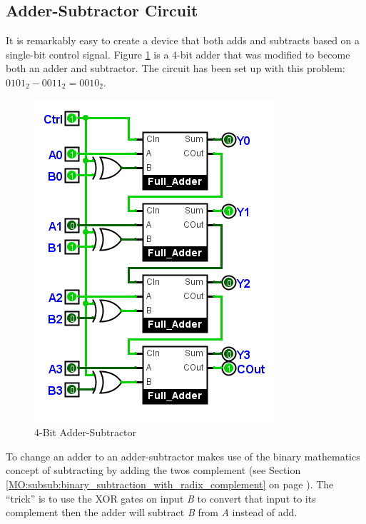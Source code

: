 \subsection{Adder-Subtractor Circuit}
\label{CL:subsec:adder_subtractor_circuit}

It is remarkably easy to create a device that both adds and subtracts based on a single-bit control signal. Figure \ref{fig:08_11} is a 4-bit adder that was modified to become both an adder and subtractor. The circuit has been set up with this problem: $ 0101_2 - 0011_2 = 0010_2 $. 

\begin{figure}[H]
	\centering
	\includegraphics[width=\maxwidth{.95\linewidth}]{gfx/08_11}
	\caption{4-Bit Adder-Subtractor}
	\label{fig:08_11}
\end{figure}

To change an adder to an adder-subtractor makes use of the binary mathematics concept of subtracting by adding the twos complement (see Section \ref{MO:subsub:binary_subtraction_with_radix_complement} on page \pageref{MO:subsub:binary_subtraction_with_radix_complement}). The ``trick'' is to use the \textsf{XOR} gates on input \emph{B} to convert that input to its complement then the adder will subtract \emph{B} from \emph{A} instead of add. 

